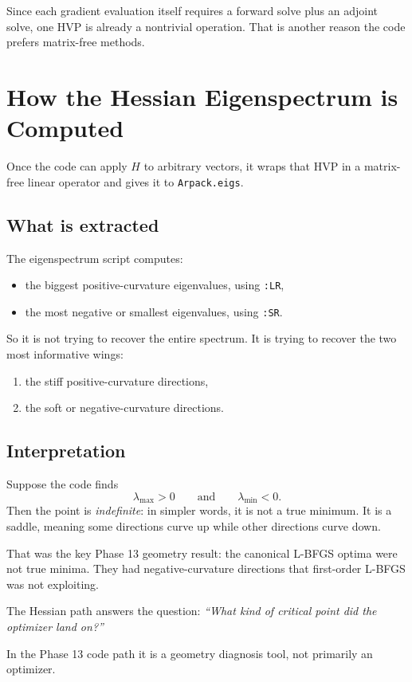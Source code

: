 \documentclass[11pt,letterpaper]{article}
\begin{document}
Since each gradient evaluation itself requires a forward solve plus an adjoint
solve, one HVP is already a nontrivial operation. That is another reason the
code prefers matrix-free methods.

\section{How the Hessian Eigenspectrum is Computed}

Once the code can apply $H$ to arbitrary vectors, it wraps that HVP in a
matrix-free linear operator and gives it to \texttt{Arpack.eigs}.

\subsection{What is extracted}

The eigenspectrum script computes:
\begin{itemize}[leftmargin=*]
  \item the biggest positive-curvature eigenvalues, using \texttt{:LR},
  \item the most negative or smallest eigenvalues, using \texttt{:SR}.
\end{itemize}

So it is not trying to recover the entire spectrum. It is trying to recover
the two most informative wings:
\begin{enumerate}[leftmargin=*]
  \item the stiff positive-curvature directions,
  \item the soft or negative-curvature directions.
\end{enumerate}

\subsection{Interpretation}

Suppose the code finds
\[
\lambda_{\max} > 0
\qquad\text{and}\qquad
\lambda_{\min} < 0.
\]
Then the point is \emph{indefinite}: in simpler words, it is not a true minimum.
It is a saddle, meaning some directions curve up while other directions curve
down.

That was the key Phase 13 geometry result: the canonical L-BFGS optima were not
true minima. They had negative-curvature directions that first-order L-BFGS was
not exploiting.

\begin{keyidea}
The Hessian path answers the question:
\emph{``What kind of critical point did the optimizer land on?''}

In the Phase 13 code path it is a geometry diagnosis tool, not primarily an
optimizer.
\end{keyidea}
\end{document}

